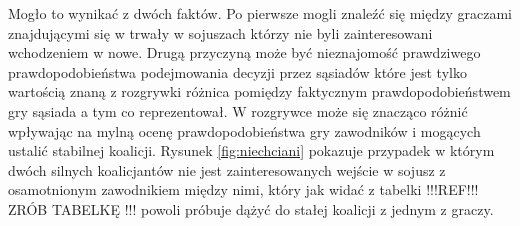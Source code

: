 Mogło to wynikać z dwóch faktów. Po pierwsze mogli znaleźć się między graczami znajdującymi się w trwały w sojuszach którzy nie byli zainteresowani wchodzeniem w nowe. Drugą przyczyną może być nieznajomość prawdziwego prawdopodobieństwa podejmowania decyzji przez sąsiadów które jest tylko wartością znaną z rozgrywki różnica pomiędzy faktycznym prawdopodobieństwem gry sąsiada a tym co reprezentował. W rozgrywce może się znacząco różnić wpływając na mylną ocenę prawdopodobieństwa gry zawodników i mogących ustalić stabilnej koalicji. Rysunek \ref{fig:niechciani} pokazuje przypadek w którym dwóch silnych koalicjantów nie jest zainteresowanych wejście w sojusz z osamotnionym zawodnikiem między nimi, który jak widać z tabelki !!!REF!!! ZRÓB TABELKĘ !!! powoli próbuje dążyć do stałej koalicji z jednym z graczy.  



